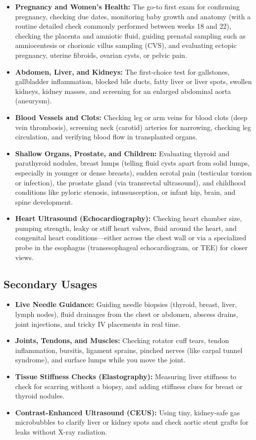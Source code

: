 \begin{itemize}
    \item \textbf{Pregnancy and Women's Health:} The go-to first exam for confirming pregnancy, checking due dates, monitoring baby growth and anatomy (with a routine detailed check commonly performed between weeks 18 and 22), checking the placenta and amniotic fluid, guiding prenatal sampling such as amniocentesis or chorionic villus sampling (CVS), and evaluating ectopic pregnancy, uterine fibroids, ovarian cysts, or pelvic pain.
    \item \textbf{Abdomen, Liver, and Kidneys:} The first-choice test for gallstones, gallbladder inflammation, blocked bile ducts, fatty liver or liver spots, swollen kidneys, kidney masses, and screening for an enlarged abdominal aorta (aneurysm).
    \item \textbf{Blood Vessels and Clots:} Checking leg or arm veins for blood clots (deep vein thrombosis), screening neck (carotid) arteries for narrowing, checking leg circulation, and verifying blood flow in transplanted organs.
    \item \textbf{Shallow Organs, Prostate, and Children:} Evaluating thyroid and parathyroid nodules, breast lumps (telling fluid cysts apart from solid lumps, especially in younger or dense breasts), sudden scrotal pain (testicular torsion or infection), the prostate gland (via transrectal ultrasound), and childhood conditions like pyloric stenosis, intussusception, or infant hip, brain, and spine development.
    \item \textbf{Heart Ultrasound (Echocardiography):} Checking heart chamber size, pumping strength, leaky or stiff heart valves, fluid around the heart, and congenital heart conditions---either across the chest wall or via a specialized probe in the esophagus (transesophageal echocardiogram, or TEE) for closer views.
\end{itemize}

\subsection{Secondary Usages}

\begin{itemize}
    \item \textbf{Live Needle Guidance:} Guiding needle biopsies (thyroid, breast, liver, lymph nodes), fluid drainages from the chest or abdomen, abscess drains, joint injections, and tricky IV placements in real time.
    \item \textbf{Joints, Tendons, and Muscles:} Checking rotator cuff tears, tendon inflammation, bursitis, ligament sprains, pinched nerves (like carpal tunnel syndrome), and surface lumps while you move the joint.
    \item \textbf{Tissue Stiffness Checks (Elastography):} Measuring liver stiffness to check for scarring without a biopsy, and adding stiffness clues for breast or thyroid nodules.
    \item \textbf{Contrast-Enhanced Ultrasound (CEUS):} Using tiny, kidney-safe gas microbubbles to clarify liver or kidney spots and check aortic stent grafts for leaks without X-ray radiation.
\end{itemize}

